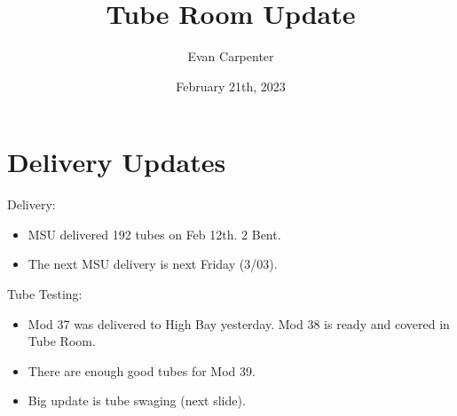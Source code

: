 \documentclass{beamer}
\title{Tube Room Update}
\author{Evan Carpenter}
\date{February 21th, 2023}
\begin{document}
\begin{frame}
	\titlepage
\end{frame}
\section{Delivery Updates}
	\begin{frame}
		\begin{block}{Delivery:}
			\begin{itemize}
				\item \small MSU delivered 192 tubes on Feb 12th. 2 Bent. 
				\item The next MSU delivery is next Friday (3/03).
			\end{itemize}
		\end{block}	
		\begin{block}{Tube Testing:}
			\begin{itemize}
				\item Mod 37 was delivered to High Bay yesterday. Mod 38 is ready and covered in Tube Room. 
				\item There are enough good tubes for Mod 39.
				\item Big update is tube swaging (next slide).
			\end{itemize}
		\end{block}
	\end{frame}
\end{document}
